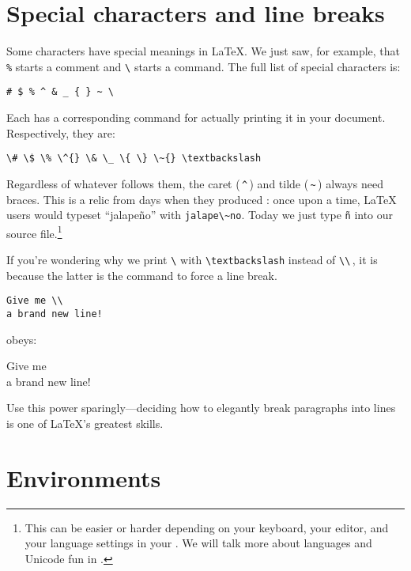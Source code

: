 \section{Special characters and line breaks}

Some characters have special meanings in \LaTeX.
We just saw, for example, that \verb|%| starts a comment
and \verb|\| starts a command.
The full list of special characters is:
\begin{leftfigure}
\begin{lstlisting}
# $ % ^ & _ { } ~ \
\end{lstlisting}
\end{leftfigure}
Each has a corresponding command
for actually printing it in your document. Respectively, they are:
\begin{leftfigure}
\begin{lstlisting}
\# \$ \% \^{} \& \_ \{ \} \~{} \textbackslash
\end{lstlisting}
\end{leftfigure}
Regardless of whatever follows them,
the caret (\,\texttt{\^{}}\,) and tilde (\,\texttt{\~{}}\,) always need braces.
This is a relic from days when they produced :
once upon a time, \LaTeX{} users would typeset ``jalapeño'' with
\verb|jalape\~no|.
Today we just type \texttt{ñ} into our source
file.\punckern\footnote{This can be easier or harder depending
on your keyboard, your editor, and your language settings in your .
We will talk more about languages and Unicode fun in .}

If you're wondering why we print \texttt{\textbackslash} with
\verb|\textbackslash| instead of \verb|\\|\,,
it is because the latter is the command to force a line break.
\begin{leftfigure}
\begin{lstlisting}
Give me \\
a brand new line!
\end{lstlisting}
\end{leftfigure}
obeys:
\begin{leftfigure}
\lm Give me \\
a brand new line!
\end{leftfigure}
Use this power sparingly---deciding how to elegantly break paragraphs into
lines is one of \LaTeX{}'s greatest skills.

\section{Environments}

